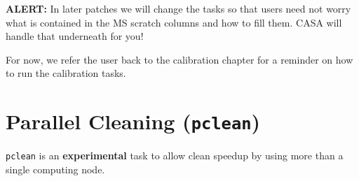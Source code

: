 {\bf ALERT:} In later patches we
will change the tasks so that users need not worry what is contained in
the MS scratch columns and how to fill them.  CASA will handle that 
underneath for you!

For now, we refer the user back to the calibration chapter for
a reminder on how to run the calibration tasks. 


\section{Parallel Cleaning ({\tt pclean})}
\label{section:im.pclean}

{\tt pclean} is an {\bf experimental} task to allow clean speedup by using
more than a single computing node. 

